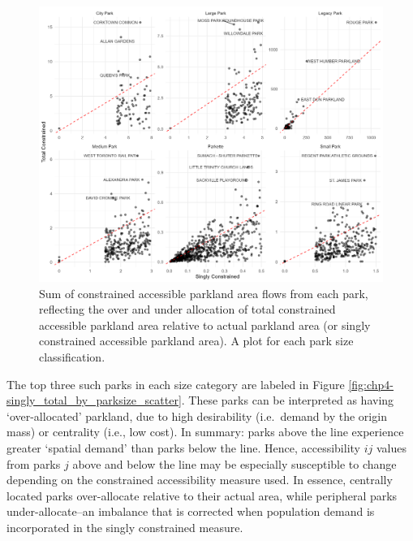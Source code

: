 \documentclass[
11pt, %
oneside, %
english, %
singlespacing, %
]{macthesis} %
\begin{document}
\begin{figure}

{\centering \includegraphics[width=6in]{./data/figures/chp4-singly_total_by_parksize_scatter} 

}

\caption{\label{fig:chp4-singly_total_by_parksize_scatter} Sum of constrained accessible parkland area flows from each park, reflecting the over and under allocation of total constrained accessible parkland area relative to actual parkland area (or singly constrained accessible parkland area). A plot for each park size classification.}\label{fig:unnamed-chunk-57}
\end{figure}

The top three such parks in each size category are labeled in Figure \ref{fig:chp4-singly_total_by_parksize_scatter}. These parks can be interpreted as having `over-allocated' parkland, due to high desirability (i.e.~demand by the origin mass) or centrality (i.e., low cost). In summary: parks above the line experience greater `spatial demand' than parks below the line. Hence, accessibility \(ij\) values from parks \(j\) above and below the line may be especially susceptible to change depending on the constrained accessibility measure used. In essence, centrally located parks over-allocate relative to their actual area, while peripheral parks under-allocate--an imbalance that is corrected when population demand is incorporated in the singly constrained measure.
\end{document}
